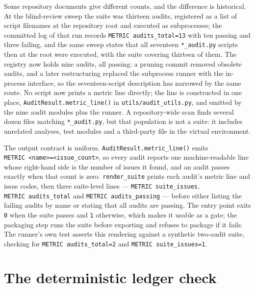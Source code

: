 \documentclass[12pt,a4paper]{report}
\begin{document}
Some repository documents give different counts, and the difference is
historical. At the blind-review sweep the suite was thirteen audits,
registered as a list of script filenames at the repository root and
executed as subprocesses; the committed log of that run records
\texttt{METRIC\ audits\_total=13} with ten passing and three failing,
and the same sweep states that all seventeen \texttt{*\_audit.py}
scripts then at the root were executed, with the suite covering thirteen
of them. The registry now holds nine audits, all passing: a pruning
commit removed obsolete audits, and a later restructuring replaced the
subprocess runner with the in-process interface, so the seventeen-script
description has narrowed by the same route. No script now prints a
metric line directly; the line is constructed in one place,
\texttt{AuditResult.metric\_line()} in \texttt{utils/audit\_utils.py},
and emitted by the nine audit modules plus the runner. A repository-wide
scan finds several dozen files matching \texttt{*\_audit.py}, but that
population is not a suite: it includes unrelated analyses, test modules
and a third-party file in the virtual environment.

The output contract is uniform. \texttt{AuditResult.metric\_line()}
emits
\texttt{METRIC\ \textless{}name\textgreater{}=\allowbreak{}\textless{}issue\_\allowbreak{}count\textgreater{}},
so every audit reports one machine-readable line whose right-hand side
is the number of issues it found, and an audit passes exactly when that
count is zero. \texttt{render\_suite} prints each audit's metric line
and issue codes, then three suite-level lines ---
\texttt{METRIC\ suite\_issues}, \texttt{METRIC\ audits\_total} and
\texttt{METRIC\ audits\_passing} --- before either listing the failing
audits by name or stating that all audits are passing. The entry point
exits \texttt{0} when the suite passes and \texttt{1} otherwise, which
makes it usable as a gate; the packaging step runs the suite before
exporting and refuses to package if it fails. The runner's own test
asserts this rendering against a synthetic two-audit suite, checking for
\texttt{METRIC\ audits\_total=2} and \texttt{METRIC\ suite\_issues=1}.

\section{The deterministic ledger
check}\label{the-deterministic-ledger-check}
\end{document}
